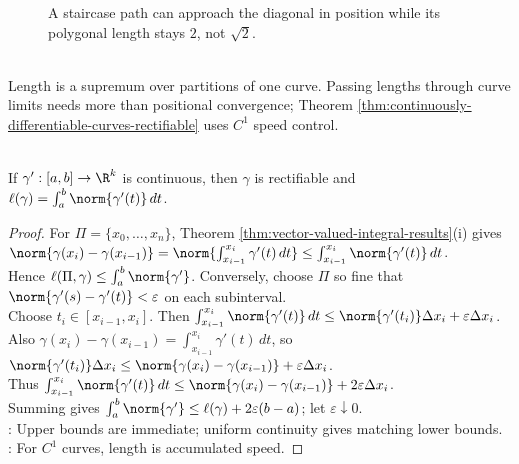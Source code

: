 \begin{figure}[H]
  \centering
  
  \caption{A staircase path can approach the diagonal in position while its polygonal length stays $2$, not $\sqrt{2}$.}
  \label{fig:staircase-length-vs-chord}
\end{figure}

\begin{perspective} \label{per:length-is-not-position-limit} \\
Length is a supremum over partitions of one curve. Passing lengths through curve limits needs more than positional convergence; Theorem \ref{thm:continuously-differentiable-curves-rectifiable} uses $C^1$ speed control.
\end{perspective}

\begin{theorem} \label{thm:continuously-differentiable-curves-rectifiable} \\
If $\gamma':[a,b]\to\R^k$ is continuous, then $\gamma$ is rectifiable and $\ell(\gamma)=\int_a^b\norm{\gamma'(t)}\,dt$.
\begin{proof}
For $\Pi=\{x_0,\ldots,x_n\}$, Theorem \ref{thm:vector-valued-integral-results}(i) gives $\norm{\gamma(x_i)-\gamma(x_{i-1})} =\norm{\int_{x_{i-1}}^{x_i}\gamma'(t)\,dt} \leq\int_{x_{i-1}}^{x_i}\norm{\gamma'(t)}\,dt$.\\
Hence $\ell(\Pi,\gamma)\leq\int_a^b\norm{\gamma'}$. Conversely, choose $\Pi$ so fine that $\norm{\gamma'(s)-\gamma'(t)}<\varepsilon$ on each subinterval.\\
Choose $t_i\in[x_{i-1},x_i]$. Then $\int_{x_{i-1}}^{x_i}\norm{\gamma'(t)}\,dt \leq \norm{\gamma'(t_i)}\Delta x_i+\varepsilon\Delta x_i$.\\
Also $\gamma(x_i)-\gamma(x_{i-1})=\int_{x_{i-1}}^{x_i}\gamma'(t)\,dt$, so $\norm{\gamma'(t_i)}\Delta x_i \leq \norm{\gamma(x_i)-\gamma(x_{i-1})}+\varepsilon\Delta x_i$.\\
Thus $\int_{x_{i-1}}^{x_i}\norm{\gamma'(t)}\,dt \leq \norm{\gamma(x_i)-\gamma(x_{i-1})}+2\varepsilon\Delta x_i$.\\
Summing gives $\int_a^b\norm{\gamma'}\leq\ell(\gamma)+2\varepsilon(b-a)$; let $\varepsilon\downarrow0$.\\
: Upper bounds are immediate; uniform continuity gives matching lower bounds.\\
: For $C^1$ curves, length is accumulated speed.
\end{proof}
\end{theorem}

